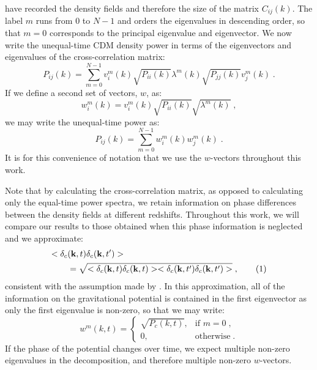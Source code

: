 \documentclass[twocolumn,superscriptaddress,prd]{revtex4}
\newcommand\numberthis{\addtocounter{equation}{1}\tag{\theequation}}
\begin{document}
have recorded the density
fields and therefore the size of the matrix $C_{ij}(k)$. 
The label $m$ runs from 0 to $N-1$ and orders the eigenvalues in descending order,
so that $m=0$ corresponds to the principal eigenvalue and eigenvector.
We now write the unequal-time CDM density power in
terms of the eigenvectors and eigenvalues of the cross-correlation matrix:
\begin{equation}
  P_{ij}(k) = \sum_{m=0}^{N-1} v^m_i(k) \sqrt{P_{ii}(k)} \lambda^m(k) \sqrt{P_{jj}(k)}
  v^m_j(k) \;.
\end{equation}
If we define a second set of vectors, $w$, as: 
\begin{equation}
  w^m_i(k) = v^m_i(k) \sqrt{P_{ii}(k)} \sqrt{\lambda^m(k)}  \;,
\end{equation}
we may write the unequal-time power as:
\begin{equation}\label{eqn:unequaltime}
  P_{ij}(k) = \sum_{m=0}^{N-1} w^m_i(k) w^m_j(k) \;.
\end{equation}
It is for this convenience of notation that we use the $w$-vectors
throughout this work.

Note that by calculating the cross-correlation matrix, as
opposed to calculating only the equal-time power spectra, we 
retain information on phase differences between the density
fields at different redshifts.  
Throughout this work, we will compare our
results to those obtained when this phase information is
neglected and we approximate:
\begin{align*}
  <\delta_c&(\mathbf{k},t ) \delta_c(\mathbf{k},t')> \\
&= \sqrt{
    <\delta_c(\mathbf{k},t) \delta_c(\mathbf{k},t)><\delta_c(\mathbf{k},t')
    \delta_c(\mathbf{k},t')> } \;, \numberthis
\end{align*}
consistent with the assumption made by \cite{yacine12}.  In this
approximation, all of the information on the gravitational potential
is contained in the first eigenvector as only the first eigenvalue is
non-zero, so that we may write:
\begin{equation}
  w^m(k,t) = 
  \begin{cases}
    \sqrt{ P_c(k, t ) }, & \text{if } m=0\;, \\
    0, & \text{otherwise} \;.
  \end{cases}
\end{equation}
If the phase of the potential changes over time, we expect 
multiple non-zero eigenvalues in the decomposition, and
therefore multiple non-zero $w$-vectors.
\end{document}
